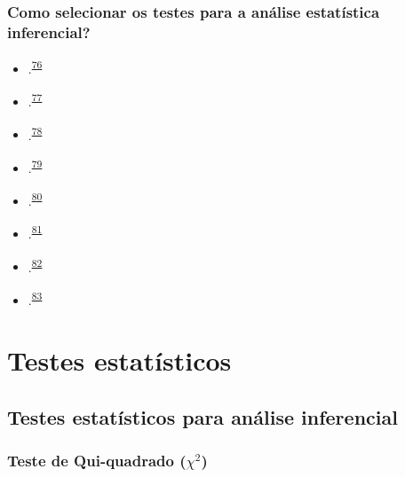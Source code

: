 \documentclass[
]{book}
\begin{document}
\hypertarget{como-selecionar-os-testes-para-a-anuxe1lise-estatuxedstica-inferencial}{%
\subsection{Como selecionar os testes para a análise estatística inferencial?}\label{como-selecionar-os-testes-para-a-anuxe1lise-estatuxedstica-inferencial}}

\begin{itemize}
\item
  .\textsuperscript{\protect\hyperlink{ref-dwivedi2019}{76}}
\item
  .\textsuperscript{\protect\hyperlink{ref-Dwivedi2022}{77}}
\item
  .\textsuperscript{\protect\hyperlink{ref-Kim2017}{78}}
\item
  .\textsuperscript{\protect\hyperlink{ref-marusteri2010}{79}}
\item
  .\textsuperscript{\protect\hyperlink{ref-mishra2019}{80}}
\item
  .\textsuperscript{\protect\hyperlink{ref-ray2021}{81}}
\item
  .\textsuperscript{\protect\hyperlink{ref-nayak2011}{82}}
\item
  .\textsuperscript{\protect\hyperlink{ref-shankar2014}{83}}
\end{itemize}

\hypertarget{testes-estatisticos}{%
\chapter{\texorpdfstring{\textbf{Testes estatísticos}}{Testes estatísticos}}\label{testes-estatisticos}}

\hypertarget{testes-analise-inferencial}{%
\section{Testes estatísticos para análise inferencial}\label{testes-analise-inferencial}}

\hypertarget{teste-de-qui-quadrado-chi2}{%
\subsection{\texorpdfstring{Teste de Qui-quadrado (\(\chi^2\))}{Teste de Qui-quadrado (\textbackslash chi\^{}2)}}\label{teste-de-qui-quadrado-chi2}}
\end{document}
